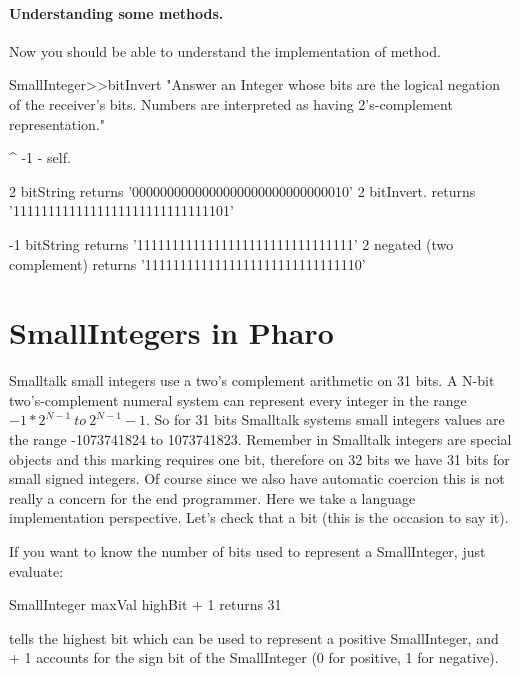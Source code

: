 \documentclass[a4paper,10pt,twoside]{book}
\begin{document}
\paragraph{Understanding some methods.}
Now you should be able to understand the implementation of  method.

\begin{code}{}
SmallInteger>>bitInvert
    "Answer an Integer whose bits are the logical negation of the receiver's bits.
    Numbers are interpreted as having 2's-complement representation."

	^ -1 - self.
\end{code}

\begin{code}{}
2 bitString
	returns '0000000000000000000000000000010'
2 bitInvert.
	returns '1111111111111111111111111111101'
	
-1 bitString
	returns '1111111111111111111111111111111'
2 negated (two complement)
	returns '1111111111111111111111111111110'
\end{code}


\section{SmallIntegers in Pharo}

Smalltalk small integers use a two's complement arithmetic on 31 bits.  A N-bit two's-complement numeral system can represent every integer in the range $-1 * 2^{N-1}\ to\ 2^{N-1}-1$. So for 31 bits Smalltalk systems small integers values are the range -1073741824 to  1073741823.  Remember in Smalltalk integers are special objects and this marking requires one bit, therefore on 32 bits we have 31 bits for small signed integers. Of course since we also have automatic coercion this is not really a concern for the end programmer. Here we take a language implementation perspective.
 Let's check that a bit (this is the occasion to say it). 

If you want to know the number of bits used to represent a
SmallInteger, just evaluate:

\begin{code}{}
SmallInteger maxVal highBit + 1
	returns 31
\end{code}

 tells the highest bit which can be used to
represent a positive SmallInteger, and + 1 accounts for the sign bit
of the SmallInteger (0 for positive, 1 for negative).
\end{document}
